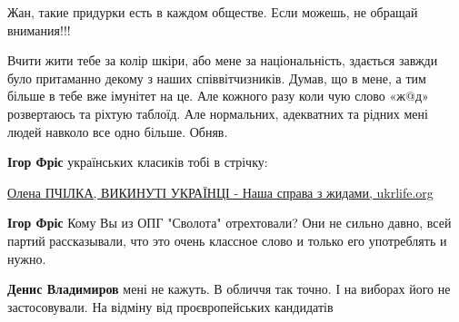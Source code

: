 \begin{itemize}
Жан, такие придурки есть в каждом обществе. Если можешь, не обращай внимания!!!

 


Вчити жити тебе за колір шкіри, або мене за національність, здається завжди
було притаманно декому з наших співвітчизників. Думав, що в мене, а тим більше
в тебе вже імунітет на це. Але кожного разу коли чую слово «ж@д» розвертаюсь та
ріхтую таблоїд. Але нормальних, адекватних та рідних мені людей навколо все
одно більше. Обняв.

\begin{itemize}
 
\textbf{Ігор Фріс} українських класиків тобі в стрічку:

\href{http://ukrlife.org/main/evshan/pchilka1.html}{%
Олена ПЧІЛКА, ВИКИНУТІ УКРАЇНЦІ - Наша справа з жидами, ukrlife.org%
}

 
\textbf{Ігор Фріс} Кому Вы из ОПГ "Сволота" отрехтовали? Они не сильно давно,
всей партий рассказывали, что это очень классное слово и только его употреблять
и нужно.

 

\textbf{Денис Владимиров} мені не кажуть. В обличчя так точно. І на виборах
його не застосовували. На відміну від проєвропейських кандидатів \Smiley[1.0][yellow]

 


\end{itemize}
\end{itemize}
